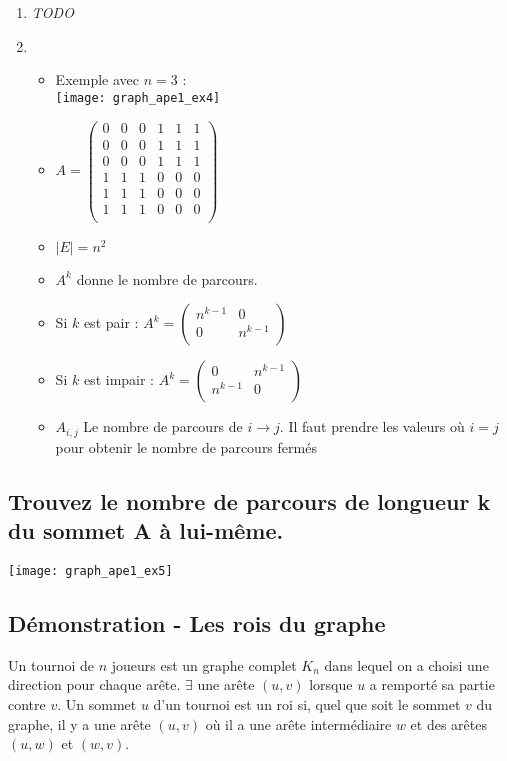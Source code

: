 \begin{solution}
\begin{enumerate}
    \item \emph{TODO}
\item
	\begin{itemize}
	\item Exemple avec $n=3$ :\\
	\texttt{[image: graph\_ape1\_ex4]}
	\item
	 $A = \begin{pmatrix}
	 0&0&0&1&1&1\\
	 0&0&0&1&1&1\\
	 0&0&0&1&1&1\\
	 1&1&1&0&0&0\\
	 1&1&1&0&0&0\\
	 1&1&1&0&0&0\\
	 \end{pmatrix}$

	\item $|E| = n^{2}$

	\item $A^{k} $ donne le nombre de parcours.
	\item Si $k$ est pair :
	 $A^{k} =  \left(
	 \begin{array}{c|c}
	 n^{k-1} & 0\\
	 \hline
	 0 & n^{k-1}\\
	 \end{array}
	 \right)
	 $
	\item Si $k$ est impair :
	 $A^{k} =  \left(
	 \begin{array}{c|c}
	 0 & n^{k-1}\\
	 \hline
	 n^{k-1}&0\\
	 \end{array}
	 \right)
	 $
	\item $A_{i,j}$ Le nombre de parcours de $i \rightarrow j$. Il faut prendre les valeurs où $i = j$ pour obtenir le nombre de parcours fermés
\end{itemize}
\end{enumerate}
\end{solution}

\subsection{Trouvez le nombre de parcours de longueur k du sommet A à lui-même.}
\texttt{[image: graph\_ape1\_ex5]}


\subsection{Démonstration - Les rois du graphe}
Un tournoi de $n$ joueurs est un graphe complet $K_{n}$ dans lequel on a choisi une direction pour chaque arête.
$\exists$ une arête $(u,v)$ lorsque $u$ a remporté sa partie contre $v$.
Un sommet $u$ d'un tournoi est un roi si, quel que soit le sommet $v$ du graphe,
il y a une arête $(u,v)$ où il a une arête intermédiaire $w$ et des arêtes $(u,w)$ et $(w,v)$.

